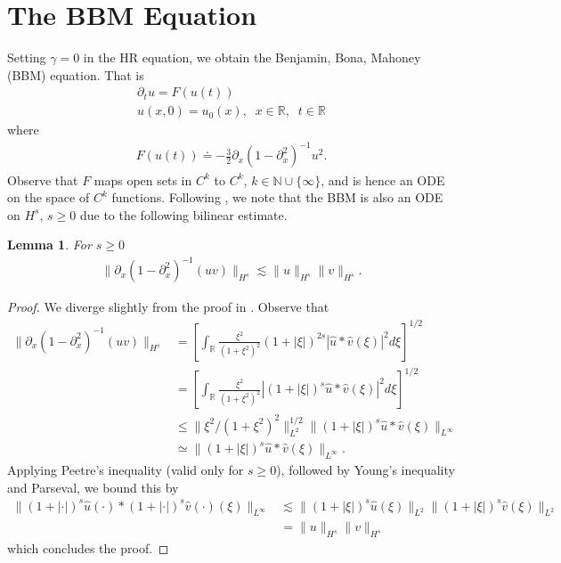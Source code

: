 \documentclass[12pt,reqno]{amsart}
\numberwithin{equation}{section}  %
\newcommand{\rr}{\mathbb{R}}
\newcommand{\wh}{\widehat}
\newcommand{\p}{\partial}
\newtheorem{lemma}[theorem]{Lemma}
\begin{document}
\section{The BBM Equation} 
\label{sec:}
Setting $\gamma = 0$ in the HR equation, we obtain the Benjamin, Bona,
Mahoney (BBM) equation. That is
%
%
\begin{gather*}
\p_{t} u = F(u(t))
\\
u(x,0) = u_0(x), \; \; x \in \rr, \; \; t \in \rr
\end{gather*}
where
%
%
\begin{equation*}
\begin{split}
F(u(t)) \doteq -\frac{3}{2} \p_{x}(1 - \p_{x}^{2})^{-1} u^{2}.
\end{split}
\end{equation*}
%
Observe that $F$ maps open sets in $C^{k}$ to $C^{k}$,  $k \in \mathbb N \cup
\{\infty \}$, and is hence an ODE on the space of $C^{k}$ functions. Following
\cite{Bona_2009_Sharp-well-pose}, we note that the BBM is also an ODE on
$H^{s}$, $s \ge 0$ due to the following bilinear estimate.
%
%
%
%
%
%
%
%
\begin{lemma}
For $s \ge 0$
%
%
\begin{equation*}
\begin{split}
\| \p_{x}(1 - \p_{x}^{2})^{-1} (uv) \|_{H^{s}} \lesssim \| u \|_{H^{s}} \| v \|_{H^{s}}.
\end{split}
\end{equation*}
%
%
\label{lem:bbm-bilin-est}
\end{lemma}
%
%
%
\begin{proof}
We diverge slightly from the proof in \cite{Bona_2009_Sharp-well-pose}. Observe that
\begin{equation*}
\begin{split}
\| \p_{x}(1 - \p_{x}^{2})^{-1} (uv) \|_{H^{s}}
& = \left [ \int_{\rr} \frac{\xi^{2}}{(1 + \xi^{2})^{2}} (1 + |\xi|)^{2s} | \wh{u} * \wh{v}(\xi) |^{2} d \xi \right ]^{1/2}
\\
& = \left [ \int_{\rr} \frac{\xi^{2}}{(1 + \xi^{2})^{2}} | (1 + |\xi|)^{s}\wh{u} * \wh{v}(\xi) |^{2} d \xi \right ]^{1/2}
\\
& \le \| \xi^{2}/(1 + \xi^{2})^{2} \|_{L^{2}}^{1/2} \| (1 + |\xi|)^{s} \wh{u} * \wh{v}(\xi) \|_{L^{\infty}}
\\
& \simeq \| (1 + |\xi|)^{s} \wh{u} * \wh{v}(\xi) \|_{L^{\infty}}.
\end{split}
\end{equation*}
%
Applying Peetre's inequality (valid only for $s \ge 0$), followed by Young's inequality and Parseval, we bound this by
%
%
%
%
\begin{equation*}
\begin{split}
\| (1 + |\cdot| )^{s}\wh{u}(\cdot) * (1 + |\cdot| )^{s}\wh{v}(\cdot)(\xi) \|_{L^{\infty}} 
& \lesssim \| (1 + |\xi| )^{s}\wh{u}(\xi)\|_{L^{2}} \| (1 + |\xi| )^{s}\wh{v}(\xi) \|_{L^{2}}
\\
&  = \| u \|_{H^{s}} \| v \|_{H^{s}}
\end{split}
\end{equation*}
%
%
which concludes the proof.
%
\end{proof}
\end{document}
